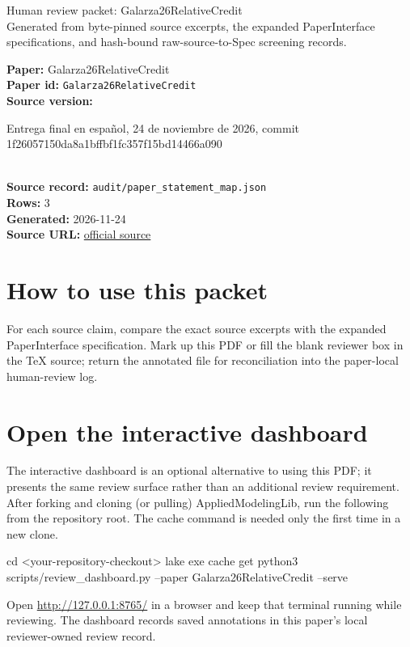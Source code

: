 \documentclass[10pt]{article}
\begin{document}
\fontsize{9}{10}\selectfont

\begin{center}
{\LARGE Human review packet: Galarza26RelativeCredit}\\[0.35em]
\small Generated from byte-pinned source excerpts, the expanded PaperInterface
specifications, and hash-bound raw-source-to-Spec screening records.
\end{center}

\noindent\textbf{Paper:} Galarza26RelativeCredit\\
\textbf{Paper id:} \texttt{Galarza26RelativeCredit}\\
\textbf{Source version:} \parbox[t]{0.76\linewidth}{\raggedright Entrega final en español, 24 de noviembre de 2026, commit 1f26057150da8a1bffbf1fc357f15bd14466a090}\\
\textbf{Source record:} \texttt{audit/paper\_statement\_map.json}\\
\textbf{Rows:} 3\\
\textbf{Generated:} 2026-11-24\\
\textbf{Source URL:} \href{https://github.com/fgalarzac/ai-project/blob/1f26057150da8a1bffbf1fc357f15bd14466a090/paper/paper.pdf}{official source}





\section*{How to use this packet}
For each source claim, compare the exact source excerpts with the expanded
PaperInterface specification. Mark up this PDF or fill the blank reviewer box in the TeX source;
return the annotated file for reconciliation into the paper-local human-review
log.

\section*{Open the interactive dashboard}
The interactive dashboard is an optional alternative to using this PDF; it
presents the same review surface rather than an additional review requirement.
After forking and cloning (or pulling) AppliedModelingLib, run the following from the
repository root. The cache command is needed only the first time in a new clone.
\begin{ReviewVerbatim}
cd <your-repository-checkout>
lake exe cache get
python3 scripts/review_dashboard.py --paper Galarza26RelativeCredit --serve
\end{ReviewVerbatim}
Open \url{http://127.0.0.1:8765/} in a browser and keep that terminal running
while reviewing. The dashboard records saved annotations in this paper's local
reviewer-owned review record.
\end{document}
